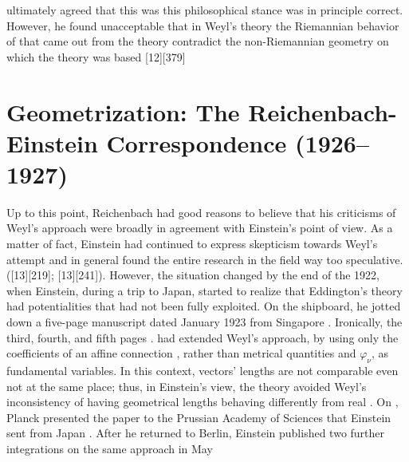 \documentclass[draft]{article}
\newcommand{\phin}{\ensuremath{\varphi_\nu}\xspace}
\begin{document}
ultimately agreed that this was this philosophical stance was in principle correct. However, he found unacceptable that in Weyl's theory the Riemannian behavior of \rac that came out from the theory contradict the non-Riemannian geometry on which the theory was based [12][379]

\section{Geometrization: The Reichenbach-Einstein Correspondence (1926--1927)}
\label{geometrization}

Up to this point, Reichenbach had good reasons to believe that his criticisms of Weyl's approach were broadly in agreement with Einstein's point of view. As a matter of fact, Einstein had continued to express skepticism towards Weyl's attempt  and in general found the entire research in the field way too speculative. ([13][219]; [13][241]). However, the situation changed by the end of the 1922, when Einstein, during a trip to Japan, started to realize that Eddington's theory had potentialities that had not been fully exploited. On the shipboard, he jotted down a five-page manuscript dated January 1923 from Singapore . Ironically, the third, fourth, and fifth pages  \citep{Reichenbach1921}. \citet{Eddington1921} had extended Weyl's approach, by using only the coefficients of an affine connection \Gtmn, rather than metrical quantities \gmn and \phin, as fundamental variables. In this context, vectors' lengths are not comparable even not at the same place; thus, in Einstein's view, the theory avoided Weyl's inconsistency of having geometrical lengths behaving differently from real \rac.  On , Planck presented the paper  to the Prussian Academy of Sciences that Einstein sent from Japan \citep{Einstein1923c}. After he returned to Berlin, Einstein published two further integrations on the same approach in May \cite{Einstein1923c,Einstein1923e}
\end{document}

